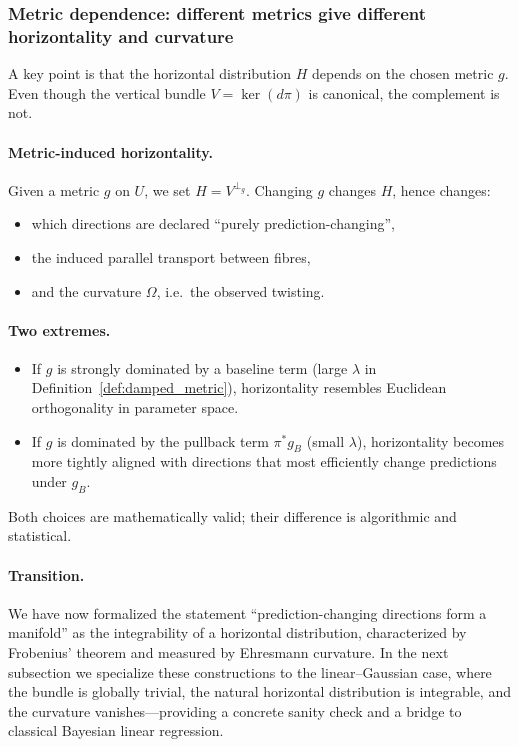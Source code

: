 \subsubsection{Metric dependence: different metrics give different horizontality and curvature}

A key point is that the horizontal distribution $H$ depends on the chosen metric $g$.
Even though the vertical bundle $V=\ker(d\pi)$ is canonical, the complement is not.

\paragraph{Metric-induced horizontality.}
Given a metric $g$ on $U$, we set $H=V^{\perp_g}$.  Changing $g$ changes $H$, hence changes:
\begin{itemize}
\item which directions are declared ``purely prediction-changing'',
\item the induced parallel transport between fibres,
\item and the curvature $\Omega$, i.e.\ the observed twisting.
\end{itemize}

\paragraph{Two extremes.}
\begin{itemize}
\item If $g$ is strongly dominated by a baseline term (large $\lambda$ in
Definition~\ref{def:damped_metric}), horizontality resembles Euclidean orthogonality in parameter space.
\item If $g$ is dominated by the pullback term $\pi^\ast g_B$ (small $\lambda$), horizontality becomes
more tightly aligned with directions that most efficiently change predictions under $g_B$.
\end{itemize}
Both choices are mathematically valid; their difference is algorithmic and statistical.

\paragraph{Transition.}
We have now formalized the statement ``prediction-changing directions form a manifold'' as the
integrability of a horizontal distribution, characterized by Frobenius' theorem and measured by
Ehresmann curvature.  In the next subsection we specialize these constructions to the linear--Gaussian
case, where the bundle is globally trivial, the natural horizontal distribution is integrable, and the
curvature vanishes—providing a concrete sanity check and a bridge to classical Bayesian linear
regression.

